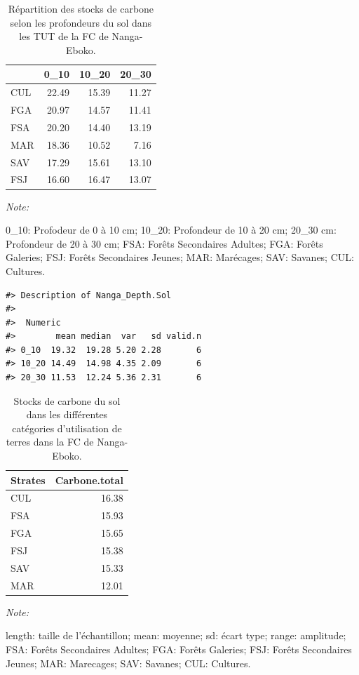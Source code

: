 \documentclass[
  12pt,
  a4paper,
  extrafontsizes,
  onecolumn,
  openright]{book}
\theoremstyle{definition}
\theoremstyle{definition}
\theoremstyle{definition}
\theoremstyle{definition}
\theoremstyle{remark}
\begin{document}
\begin{table}[H]
\centering
\caption{\label{tab:DescriptionsommairesolNanga-Eboko3} Répartition des stocks de carbone selon les profondeurs du sol dans les TUT de la FC de Nanga-Eboko.}
\centering
\begin{threeparttable}
\begin{tabular}[t]{lrrr}
\toprule
  & 0\_10 & 10\_20 & 20\_30\\
\midrule
CUL & 22.49 & 15.39 & 11.27\\
FGA & 20.97 & 14.57 & 11.41\\
FSA & 20.20 & 14.40 & 13.19\\
MAR & 18.36 & 10.52 & 7.16\\
SAV & 17.29 & 15.61 & 13.10\\
\addlinespace
FSJ & 16.60 & 16.47 & 13.07\\
\bottomrule
\end{tabular}
\begin{tablenotes}
\item \textit{Note: } 
\item 0\_10: Profodeur de 0 à 10 cm; 10\_20: Profondeur de 10 à 20 cm; 20\_30 cm: Profondeur de 20 à 30 cm; FSA: Forêts Secondaires Adultes; FGA: Forêts Galeries; FSJ: Forêts Secondaires Jeunes; MAR: Marécages; SAV: Savanes; CUL: Cultures.
\end{tablenotes}
\end{threeparttable}
\end{table}

\begin{verbatim}
#> Description of Nanga_Depth.Sol
#> 
#>  Numeric 
#>        mean median  var   sd valid.n
#> 0_10  19.32  19.28 5.20 2.28       6
#> 10_20 14.49  14.98 4.35 2.09       6
#> 20_30 11.53  12.24 5.36 2.31       6
\end{verbatim}

\begin{table}[H]
\centering
\caption{\label{tab:StockscarbonesolNanga-Eboko3}Stocks de carbone du sol dans les différentes catégories d'utilisation de terres dans la FC de Nanga-Eboko.}
\centering
\begin{threeparttable}
\begin{tabular}[t]{lr}
\toprule
Strates & Carbone.total\\
\midrule
CUL & 16.38\\
FSA & 15.93\\
FGA & 15.65\\
FSJ & 15.38\\
SAV & 15.33\\
\addlinespace
MAR & 12.01\\
\bottomrule
\end{tabular}
\begin{tablenotes}
\item \textit{Note: } 
\item length: taille de l'échantillon; mean: moyenne; sd: écart type; range: amplitude; FSA: Forêts Secondaires Adultes; FGA: Forêts Galeries; FSJ: Forêts Secondaires Jeunes; MAR: Marecages; SAV: Savanes; CUL: Cultures.
\end{tablenotes}
\end{threeparttable}
\end{table}
\end{document}

